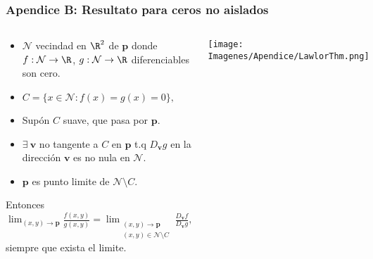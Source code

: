 \begin{frame}[label=ZerosConditions, noframenumbering]
	\frametitle{Apendice B: Resultato para ceros no aislados}    
	\begin{columns}
			\begin{Teorema} 
				\begin{itemize}
					\item 
						$\mathcal{N}$ vecindad en $\R^2$ de $\mathbf{p}$ donde
						$f:\mathcal{N}\to \R$,  
						$g:\mathcal{N}\to \R$ diferenciables son cero. 
					\item
						$
							C=\{x \in \mathcal{N}: f(x)=g(x)=0 \},
						$				
					\item
						Supón $C$ suave, que pasa por $\mathbf{p}$.
					\item
					 $\exists \ \mathbf{v}$ no tangente a $C$ en $\mathbf{p}$
						t.q  $D_{\mathbf{v}}g$ en la dirección $\mathbf{v}$ es no nula en
						$\mathcal{N}$.
					\item
						$\mathbf{p}$ es punto limite de $\mathcal{N}\setminus C$. 
			\end{itemize}
	    Entonces
				$
					\displaystyle
					\lim_{(x,y)\to \mathbf{p}}
					\frac{f(x,y)}{g(x,y)} =
					\lim_{
						\substack{
							(x,y)\to \mathbf{p}\\ 
							(x,y)\in \mathcal{N} \setminus C
						}
					}
					\frac{D_{\mathbf{v}} f }{D_{\mathbf{v}} g},
				$
				siempre que exista el limite.
			\end{Teorema}
				\texttt{[image: Imagenes/Apendice/LawlorThm.png]}
				\\
				\hyperlink{Construccion<6>}{}
				\begin{bibunit}[alpha]
					\nocite{Lawlor2012}
				\end{bibunit}
	\end{columns}
\end{frame}
